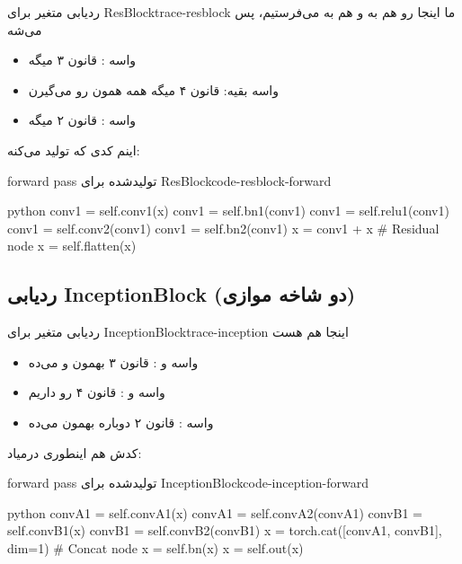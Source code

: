 \documentclass{nngraph-fa}
\begin{document}
\begin{exbox}{ردیابی متغیر برای ResBlock}{trace-resblock}
ما اینجا  رو هم به  و هم به  می‌فرستیم، پس  می‌شه

\begin{itemize}
    \item واسه : قانون ۳ میگه 
    \item واسه بقیه: قانون ۴ میگه همه همون  رو می‌گیرن
    \item واسه : قانون ۲ میگه 
\end{itemize}

اینم کدی که تولید می‌کنه:
\begin{codebox}{forward pass تولیدشده برای ResBlock}{code-resblock-forward}
\begin{amzcode}{python}
conv1 = self.conv1(x)
conv1 = self.bn1(conv1)
conv1 = self.relu1(conv1)
conv1 = self.conv2(conv1)
conv1 = self.bn2(conv1)
x     = conv1 + x       # Residual node
x     = self.flatten(x)
\end{amzcode}
\end{codebox}
\end{exbox}

\subsection{ردیابی InceptionBlock (دو شاخه موازی)}

\begin{exbox}{ردیابی متغیر برای InceptionBlock}{trace-inception}
اینجا هم  هست

\begin{itemize}
    \item واسه  و : قانون ۳ بهمون  و  می‌ده
    \item واسه  و : قانون ۴ رو داریم
    \item واسه : قانون ۲ دوباره بهمون  می‌ده
\end{itemize}

کدش هم اینطوری درمیاد:
\begin{codebox}{forward pass تولیدشده برای InceptionBlock}{code-inception-forward}
\begin{amzcode}{python}
convA1 = self.convA1(x)
convA1 = self.convA2(convA1)
convB1 = self.convB1(x)
convB1 = self.convB2(convB1)
x      = torch.cat([convA1, convB1], dim=1)  # Concat node
x      = self.bn(x)
x      = self.out(x)
\end{amzcode}
\end{codebox}
\end{exbox}
\end{document}
